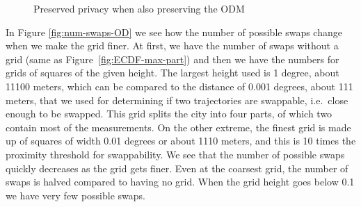 \begin{figure}
  \hfil
  \caption{Preserved privacy when also preserving the ODM}
  \label{fig:OD}
\end{figure}

In Figure \ref{fig:num-swaps-OD} we see how the number of possible
swaps change when we make the grid finer. At first, we have the number
of swaps without a grid (same as Figure~\ref{fig:ECDF-max-part}) and then we have the numbers for grids of
squares of the given height. The largest height used is 1 degree, about
11100 meters, which can be compared to the distance of 0.001 degrees,
about 111 meters, that we used for determining if two trajectories are swappable, i.e.~close enough to be swapped.  
This grid splits the city into four parts, of which two contain
most of the measurements. On the other extreme, the finest grid is made up of squares of width 0.01 degrees or about 1110 meters, and this is 10 times the proximity threshold for swappability.  
We see that the number of possible swaps quickly decreases as the grid
gets finer. Even at the coarsest grid, the number of swaps is halved
compared to having no grid. When the grid height goes below 0.1 we have
very few possible swaps.

